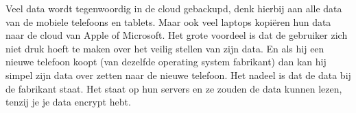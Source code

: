 Veel data wordt tegenwoordig in de cloud gebackupd, denk hierbij aan alle data van de mobiele telefoons en tablets. Maar ook veel laptops kopi\"eren hun data naar de cloud van Apple of Microsoft. Het grote voordeel is dat de gebruiker zich niet druk hoeft te maken over het veilig stellen van zijn data. En als hij een nieuwe telefoon koopt (van dezelfde operating system fabrikant) dan kan hij simpel zijn data over zetten naar de nieuwe telefoon. Het nadeel is dat de data bij de fabrikant staat. Het staat op hun servers en ze zouden de data kunnen lezen, tenzij je je data encrypt hebt.

